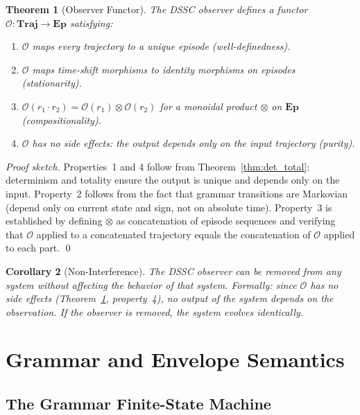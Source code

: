 \documentclass[11pt,a4paper]{article}
\theoremstyle{plain}
\newtheorem{theorem}{Theorem}[section]
\newtheorem{corollary}[theorem]{Corollary}
\theoremstyle{definition}
\theoremstyle{remark}
\newcommand{\Traj}{\mathbf{Traj}}
\newcommand{\Ep}{\mathbf{Ep}}
\newcommand{\Obs}{\mathcal{O}}
\begin{document}
\begin{theorem}[Observer Functor]
\label{thm:functor}
  The DSSC observer defines a functor $\Obs : \Traj \to \Ep$ satisfying:
  \begin{enumerate}[nosep]
    \item $\Obs$ maps every trajectory to a unique episode (well-definedness).
    \item $\Obs$ maps time-shift morphisms to identity morphisms on episodes (stationarity).
    \item $\Obs(r_1 \cdot r_2) = \Obs(r_1) \otimes \Obs(r_2)$ for a monoidal product
      $\otimes$ on $\Ep$ (compositionality).
    \item $\Obs$ has no side effects: the output depends only on the input trajectory (purity).
  \end{enumerate}
\end{theorem}
\begin{proof}[Proof sketch]
  Properties~1 and 4 follow from Theorem~\ref{thm:det_total}: determinism and totality ensure the
  output is unique and depends only on the input. Property~2 follows from the fact that grammar
  transitions are Markovian (depend only on current state and sign, not on absolute time).
  Property~3 is established by defining $\otimes$ as concatenation of episode sequences and
  verifying that $\Obs$ applied to a concatenated trajectory equals the concatenation of
  $\Obs$ applied to each part. \qed
\end{proof}

\begin{corollary}[Non-Interference]
\label{cor:noninterference}
  The DSSC observer can be removed from any system without affecting the behavior of that system.
  Formally: since $\Obs$ has no side effects (Theorem~\ref{thm:functor}, property~4), no output
  of the system depends on the observation. If the observer is removed, the system evolves
  identically.
\end{corollary}

\section{Grammar and Envelope Semantics}
\label{sec:grammar}

\subsection{The Grammar Finite-State Machine}
\end{document}
